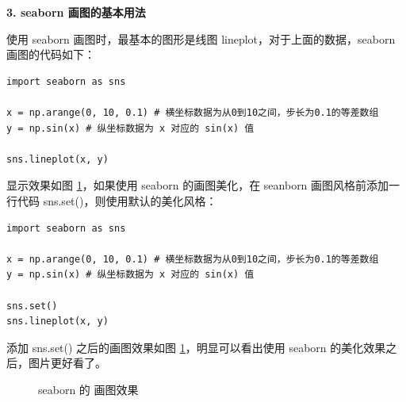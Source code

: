 \vspace{3pt}
\noindent\textbf{3. seaborn 画图的基本用法}
\vspace{3pt}

使用 seaborn 画图时，最基本的图形是线图 lineplot，对于上面的数据，seaborn 画图的代码如下：
\begin{lstlisting}[Language=Python]
import seaborn as sns

x = np.arange(0, 10, 0.1) # 横坐标数据为从0到10之间，步长为0.1的等差数组
y = np.sin(x) # 纵坐标数据为 x 对应的 sin(x) 值

sns.lineplot(x, y)
\end{lstlisting}

显示效果如图 \ref{fig:sinx-sns}，如果使用 seaborn 的画图美化，在 seanborn 画图风格前添加一行代码 sns.set()，则使用默认的美化风格：

\begin{lstlisting}[Language=Python]
import seaborn as sns

x = np.arange(0, 10, 0.1) # 横坐标数据为从0到10之间，步长为0.1的等差数组
y = np.sin(x) # 纵坐标数据为 x 对应的 sin(x) 值

sns.set()
sns.lineplot(x, y)
\end{lstlisting}

添加 sns.set() 之后的画图效果如图 \ref{fig:sinx-sns}，明显可以看出使用 seaborn 的美化效果之后，图片更好看了。

\begin{figure}[ht]
  \centering
  \caption{seaborn 的 画图效果}\label{fig:sinx-sns}

\end{figure}


